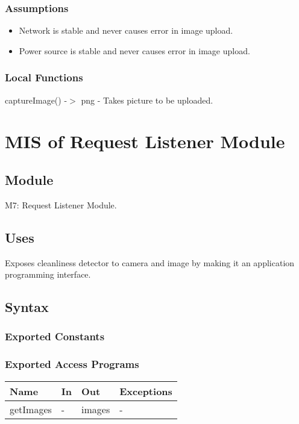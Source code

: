 \documentclass[12pt, titlepage]{article}
\begin{document}
\subsubsection{Assumptions}
\begin{itemize}
	\item Network is stable and never causes error in image upload.
	\item Power source is stable and never causes error in image upload.
\end{itemize}

\subsubsection{Local Functions}

captureImage() -$>$ png - Takes picture to be uploaded.

\newpage


\section{MIS of Request Listener Module} \label{Module} 

\subsection{Module}

M7: Request Listener Module.

\subsection{Uses}
Exposes cleanliness detector to camera and image by making it an application programming interface.

\subsection{Syntax}

\subsubsection{Exported Constants}

\subsubsection{Exported Access Programs}

\begin{center}
\begin{tabular}{p{2cm} p{4cm} p{4cm} p{2cm}}
\hline
\textbf{Name} & \textbf{In} & \textbf{Out} & \textbf{Exceptions} \\
\hline
getImages & - & images & - \\
\hline
\end{tabular}
\end{center}
\end{document}
